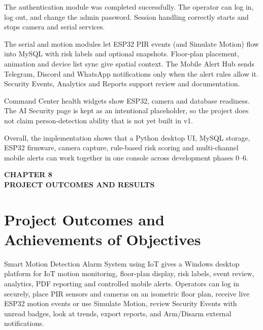 \documentclass[12pt,a4paper]{report}
\begin{document}
The authentication module was completed successfully. The operator can log in, log out, and change the admin password. Session handling correctly starts and stops camera and serial services.

The serial and motion modules let ESP32 PIR events (and Simulate Motion) flow into MySQL with risk labels and optional snapshots. Floor-plan placement, animation and device list sync give spatial context. The Mobile Alert Hub sends Telegram, Discord and WhatsApp notifications only when the alert rules allow it. Security Events, Analytics and Reports support review and documentation.

Command Center health widgets show ESP32, camera and database readiness. The AI Security page is kept as an intentional placeholder, so the project does not claim person-detection ability that is not yet built in v1.

Overall, the implementation shows that a Python desktop UI, MySQL storage, ESP32 firmware, camera capture, rule-based risk scoring and multi-channel mobile alerts can work together in one console across development phases 0--6.



\cleardoublepage
\thispagestyle{empty}

\null
\vfill

\begin{center}
    {\fontsize{16pt}{18pt}\selectfont\bfseries
    CHAPTER 8}\\[0.5cm]

    {\fontsize{16pt}{18pt}\selectfont\bfseries
    PROJECT OUTCOMES AND RESULTS}
\end{center}

\vfill
\null

\clearpage

\section{Project Outcomes and Achievements of Objectives}

Smart Motion Detection Alarm System using IoT gives a Windows desktop platform for IoT motion monitoring, floor-plan display, risk labels, event review, analytics, PDF reporting and controlled mobile alerts. Operators can log in securely, place PIR sensors and cameras on an isometric floor plan, receive live ESP32 motion events or use Simulate Motion, review Security Events with unread badges, look at trends, export reports, and Arm/Disarm external notifications.
\end{document}
